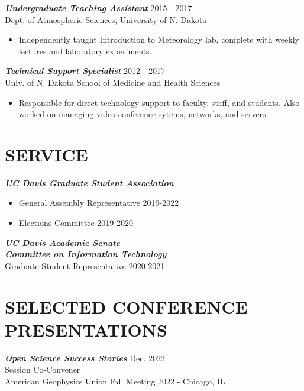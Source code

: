 \documentclass[overlapped]{res}
\begin{document}
\begin{resume}
    {\sl \textbf{Undergraduate Teaching Assistant}} \hfill 2015 - 2017 \\
    Dept. of Atmospheric Sciences, University of N. Dakota \\
    \begin{itemize}\itemsep -2pt
        \item Independently taught Introduction to Meteorology lab, complete with weekly lectures and laboratory experiments.
        
    \end{itemize}

    {\sl \textbf{Technical Support Specialist}} \hfill 2012 - 2017 \\
    Univ. of N. Dakota School of Medicine and Health Sciences \\
    \begin{itemize} \itemsep -2pt
        \item Responsible  for  direct  technology  support  to  faculty,  staff,  and  students.  Also  worked  on managing video conference sytems, networks, and servers.

    \end{itemize}
    \section{SERVICE}
    {\sl \textbf{UC Davis Graduate Student Association}} \\

    \begin{itemize}
        \item General Assembly Representative \hfill 2019-2022
        \item Elections Committee \hfill 2019-2020
    \end{itemize} 
    \newpage
    {\sl \textbf{UC Davis Academic Senate \\ Committee on Information Technology}} \\
    Graduate Student Representative \hfill 2020-2021


\section{SELECTED CONFERENCE PRESENTATIONS}

    {\sl \textbf{Open Science Success Stories}} \hfill Dec. 2022 \\
    Session Co-Convener \\
    American Geophysics Union Fall Meeting 2022 - Chicago, IL


\end{resume}
\end{document}
